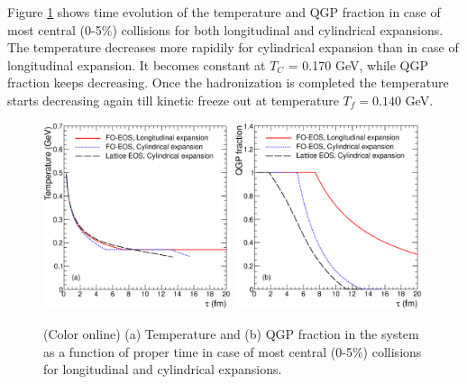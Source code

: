 \documentclass[aps,prc,preprint,superscriptaddress,showpacs,showkeys]{revtex4-1}
\begin{document}
  Figure \ref{fig:TauVsTemp} shows time evolution of the temperature and QGP fraction 
in case of most central (0-5$\%$) collisions 
for both longitudinal and cylindrical expansions. The temperature
decreases more rapidily for cylindrical expansion than in case of longitudinal expansion. 
It becomes constant at $T_C$ = 0.170 GeV,  while QGP fraction keeps decreasing. 
Once the hadronization is completed the temperature starts decreasing again till kinetic 
freeze out at temperature $T_f=0.140$ GeV.  


\begin{figure}
\includegraphics[width=0.49\textwidth]{Figures/Fig1a_TauVsTemp.eps}
\includegraphics[width=0.49\textwidth]{Figures/Fig1b_TauVsFQGP.eps}
\caption{(Color online) (a) Temperature and (b) QGP fraction in the system as a function of proper 
time in case of most central (0-5$\%$) collisions for longitudinal and cylindrical expansions.}
\label{fig:TauVsTemp}
\end{figure}

\end{document}
